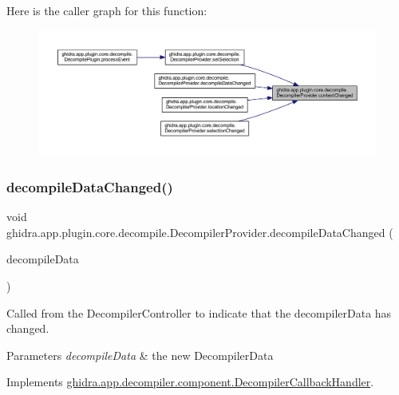 Here is the caller graph for this function\+:
\nopagebreak
\begin{figure}[H]
\begin{center}
\leavevmode
\includegraphics[width=350pt]{classghidra_1_1app_1_1plugin_1_1core_1_1decompile_1_1_decompiler_provider_a3a75d45714ac350137e8a1cef08a2241_icgraph}
\end{center}
\end{figure}
\mbox{\label{classghidra_1_1app_1_1plugin_1_1core_1_1decompile_1_1_decompiler_provider_a03b1fe5f65766c675710ccd7ac03bc02}} 
\subsubsection{\texorpdfstring{decompileDataChanged()}{decompileDataChanged()}}
{\footnotesize\ttfamily void ghidra.\+app.\+plugin.\+core.\+decompile.\+Decompiler\+Provider.\+decompile\+Data\+Changed (\begin{DoxyParamCaption}\item[{\mbox{\hyperlink{classghidra_1_1app_1_1decompiler_1_1component_1_1_decompile_data}{Decompile\+Data}}}]{decompile\+Data }\end{DoxyParamCaption})\hspace{0.3cm}{\ttfamily [inline]}}

Called from the Decompiler\+Controller to indicate that the decompiler\+Data has changed. 
\begin{DoxyParams}{Parameters}
{\em decompile\+Data} & the new Decompiler\+Data \\
\hline
\end{DoxyParams}


Implements \mbox{\hyperlink{interfaceghidra_1_1app_1_1decompiler_1_1component_1_1_decompiler_callback_handler_a317fd8c2d45cf2bef9ab0e15f4f7ed30}{ghidra.\+app.\+decompiler.\+component.\+Decompiler\+Callback\+Handler}}.



